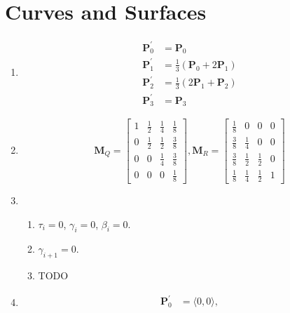 \documentclass[a4paper]{report}
\begin{document}
\chapter{Curves and Surfaces}
\begin{enumerate}
	\item
		\begin{align*}
			\mathbf{P}_0^{\prime} &= \mathbf{P}_0\\
			\mathbf{P}_1^{\prime} &= \frac{1}{3}(\mathbf{P}_0 + 2\mathbf{P}_1)\\
			\mathbf{P}_2^{\prime} &= \frac{1}{3}(2\mathbf{P}_1 + \mathbf{P}_2)\\
			\mathbf{P}_3^{\prime} &= \mathbf{P}_3
		\end{align*}
	\item
		\begin{equation*}
			\mathbf{M}_Q =
			\begin{bmatrix}
				1 & \frac{1}{2} & \frac{1}{4} & \frac{1}{8}\\
				0 & \frac{1}{2} & \frac{1}{2} & \frac{3}{8}\\
				0 & 0 & \frac{1}{4} & \frac{3}{8}\\
				0 & 0 & 0 & \frac{1}{8}
			\end{bmatrix},
			\mathbf{M}_R =
			\begin{bmatrix}
				\frac{1}{8} & 0 & 0 & 0\\
				\frac{3}{8} & \frac{1}{4} & 0 & 0\\
				\frac{3}{8} & \frac{1}{2} & \frac{1}{2} & 0\\
				\frac{1}{8} & \frac{1}{4} & \frac{1}{2} & 1
			\end{bmatrix}
		\end{equation*}
	\item
		\begin{enumerate}
			\item $\tau_{i} = 0$, $\gamma_{i} = 0$, $\beta_{i} = 0$.
			\item $\gamma_{i+1} = 0$.
			\item TODO
		\end{enumerate}
	\item
		\begin{align*}
			\mathbf{P}_0^{\prime} &= \langle 0, 0 \rangle,\\

\end{align*}
\end{enumerate}
\end{document}
